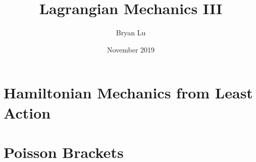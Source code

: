 \documentclass[12pt]{scrartcl}
\title{Lagrangian Mechanics III}
\author{Bryan Lu}
\date{November 2019}
\begin{document}
\maketitle

\section{Hamiltonian Mechanics from Least Action}




\section{Poisson Brackets}
\end{document}
